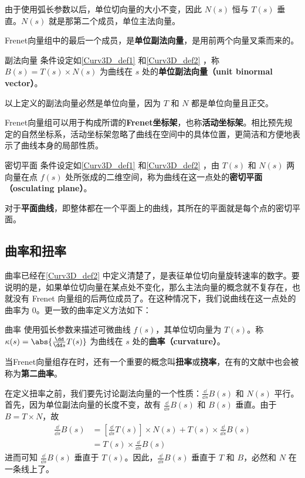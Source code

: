 由于使用弧长参数以后，单位切向量的大小不变，因此 $N(s)$ 恒与 $T(s)$ 垂直。$N(s)$ 就是那第二个成员，单位主法向量。

Frenet向量组中的最后一个成员，是\textbf{单位副法向量}，是用前两个向量叉乘而来的。

\begin{definition}{副法向量}
条件设定如\autoref{Curv3D_def1} 和\autoref{Curv3D_def2} ，称 $B(s)=T(s)\times N(s)$ 为曲线在 $s$ 处的\textbf{单位副法向量（unit binormal vector）}。
\end{definition}

以上定义的副法向量必然是单位向量，因为 $T$ 和 $N$ 都是单位向量且正交。

Frenet向量组可以用于构成所谓的\textbf{Frenet坐标架}，也称\textbf{活动坐标架}。相比预先规定的自然坐标系，活动坐标架忽略了曲线在空间中的具体位置，更简洁和方便地表示了曲线本身的局部性质。

\begin{definition}{密切平面}
条件设定如\autoref{Curv3D_def1} 和\autoref{Curv3D_def2} ，由 $T(s)$ 和 $N(s)$ 两向量在点 $f(s)$ 处所张成的二维空间，称为曲线在这一点处的\textbf{密切平面（osculating plane）}。
\end{definition}

对于\textbf{平面曲线}，即整体都在一个平面上的曲线，其所在的平面就是每个点的密切平面。

\subsection{曲率和扭率}

曲率已经在\autoref{Curv3D_def2} 中定义清楚了，是表征单位切向量旋转速率的数字。要说明的是，如果单位切向量在某点处不变化，那么主法向量的概念就不复存在，也就没有 Frenet 向量组的后两位成员了。在这种情况下，我们说曲线在这一点处的曲率为 $0$。更一致的曲率定义方法如下：
\begin{definition}{曲率}
使用弧长参数来描述可微曲线 $f(s)$，其单位切向量为 $T(s)$。称 $\kappa(s)=\abs{\frac{\dd}{\dd s}T(s)}$ 为曲线在 $s$ 处的\textbf{曲率（curvature）}。
\end{definition}

当Frenet向量组存在时，还有一个重要的概念叫\textbf{扭率}或\textbf{挠率}，在有的文献中也会被称为\textbf{第二曲率}。

在定义扭率之前，我们要先讨论副法向量的一个性质：$\frac{\dd}{\dd s}B(s)$ 和 $N(s)$ 平行。首先，因为单位副法向量的长度不变，故有 $\frac{\dd}{\dd s}B(s)$ 和 $B(s)$ 垂直。由于 $B=T\times N$，故 
\begin{equation}
\begin{aligned}
\frac{\dd}{\dd s}B(s)&=[\frac{\dd}{\dd s}T(s)]\times N(s)+T(s)\times\frac{\dd}{\dd s}B(s)\\&=T(s)\times\frac{\dd}{\dd s}B(s)
\end{aligned}
\end{equation}
进而可知 $\frac{\dd}{\dd s}B(s)$ 垂直于 $T(s)$。因此，$\frac{\dd}{\dd s}B(s)$ 垂直于 $T$ 和 $B$，必然和 $N$ 在一条线上了。

